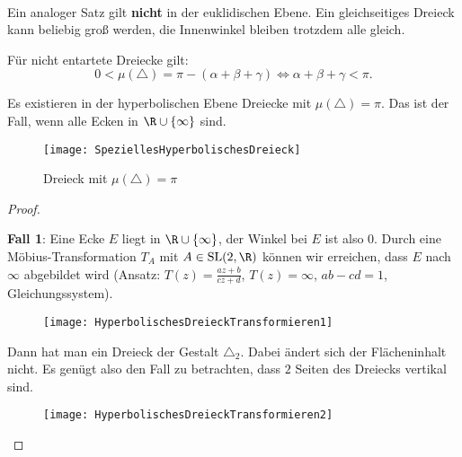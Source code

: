 \begin{remark}
  \ 
  \begin{enumerate}
    \item Ein analoger Satz gilt \textbf{nicht} in der euklidischen Ebene. Ein gleichseitiges Dreieck kann beliebig groß werden, die Innenwinkel bleiben trotzdem alle gleich.
    \item Für nicht entartete Dreiecke gilt:
    \begin{equation*}
      0 < \mu(\triangle) = \pi - (\alpha + \beta + \gamma) \Leftrightarrow \alpha + \beta + \gamma < \pi\text{.}
    \end{equation*}

    \begin{minipage}{.475\textwidth}
      \item Es existieren in der hyperbolischen Ebene Dreiecke mit \( \mu(\triangle) = \pi \). Das ist der Fall, wenn alle Ecken in \( \R \cup \left \{ \infty \right \} \) sind.
    \end{minipage}
    \hfill
    \begin{minipage}{.475\textwidth}
      \begin{figure}[H]
        \texttt{[image: SpeziellesHyperbolischesDreieck]}
        \caption{Dreieck mit \( \mu(\triangle) = \pi \)}
      \end{figure}
    \end{minipage}
    \begin{proof}
      \  \\
      \begin{minipage}{.475\textwidth}
        \textbf{Fall 1}: Eine Ecke \( E \) liegt in \( \R \cup \left \{ \infty \right \} \), der Winkel bei \( E \) ist also \(  0 \). Durch eine Möbius-Transformation \( T_A \) mit \( A \in \text{SL}(2,\R) \) können wir erreichen, dass \( E \) nach \( \infty \) abgebildet wird (Ansatz: \( T(z) = \frac{az + b}{cz + d} \), \( T(z) = \infty \), \( ab - cd = 1 \), Gleichungssystem).
      \end{minipage}
      \hfill
      \begin{minipage}{.475\textwidth}
        \begin{figure}[H]
          \texttt{[image: HyperbolischesDreieckTransformieren1]}
        \end{figure}
      \end{minipage}

      \begin{minipage}{.475\textwidth}
        Dann hat man ein Dreieck der Gestalt \( \triangle_2 \). Dabei ändert sich der Flächeninhalt nicht. Es genügt also den Fall zu betrachten, dass \( 2 \) Seiten des Dreiecks vertikal sind.
      \end{minipage}
      \hfill
      \begin{minipage}{.475\textwidth}
        \begin{figure}[H]
          \texttt{[image: HyperbolischesDreieckTransformieren2]}
        \end{figure}
      \end{minipage}



\end{proof}
\end{enumerate}
\end{remark}
